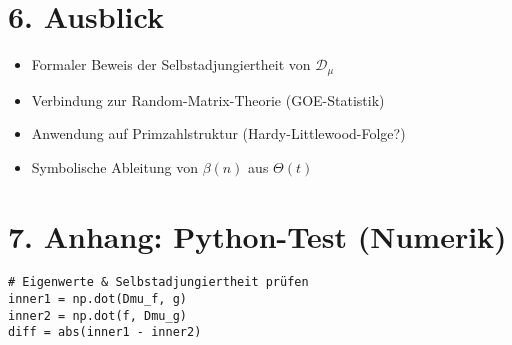 \documentclass[12pt]{article}
\begin{document}
\section*{6. Ausblick}
\begin{itemize}
  \item Formaler Beweis der Selbstadjungiertheit von \(\mathcal{D}_\mu\)
  \item Verbindung zur Random-Matrix-Theorie (GOE-Statistik)
  \item Anwendung auf Primzahlstruktur (Hardy-Littlewood-Folge?)
  \item Symbolische Ableitung von \(\beta(n)\) aus \(\Theta(t)\)
\end{itemize}

\section*{7. Anhang: Python-Test (Numerik)}
\vspace{-0.7em}
\begin{verbatim}
# Eigenwerte & Selbstadjungiertheit prüfen
inner1 = np.dot(Dmu_f, g)
inner2 = np.dot(f, Dmu_g)
diff = abs(inner1 - inner2)
\end{verbatim}
\end{document}
